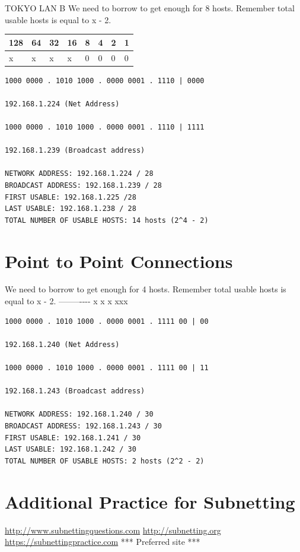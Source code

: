 TOKYO LAN B We need to borrow to get enough for 8 hosts. Remember total
usable hosts is equal to x - 2.

{\def\LTcaptype{none} %
\begin{longtable}[]{@{}llllllll@{}}
\toprule\noalign{}
128 & 64 & 32 & 16 & 8 & 4 & 2 & 1 \\
\midrule\noalign{}
\endhead
\bottomrule\noalign{}
\endlastfoot
x & x & x & x & 0 & 0 & 0 & 0 \\
\end{longtable}
}

\begin{lstlisting}
1000 0000 . 1010 1000 . 0000 0001 . 1110 | 0000

192.168.1.224 (Net Address)

1000 0000 . 1010 1000 . 0000 0001 . 1110 | 1111

192.168.1.239 (Broadcast address)

NETWORK ADDRESS: 192.168.1.224 / 28
BROADCAST ADDRESS: 192.168.1.239 / 28
FIRST USABLE: 192.168.1.225 /28
LAST USABLE: 192.168.1.238 / 28
TOTAL NUMBER OF USABLE HOSTS: 14 hosts (2^4 - 2)
\end{lstlisting}

\section{Point to Point Connections}\label{point-to-point-connections}

We need to borrow to get enough for 4 hosts. Remember total usable hosts
is equal to x - 2.
\textbar{}
\textbar---\textbar--\textbar--\textbar--\textbar-\textbar-\textbar-\textbar-\textbar{}
\textbar x \textbar x \textbar{} x\textbar{}
x\textbar x\textbar x\textbar{}

\begin{lstlisting}
1000 0000 . 1010 1000 . 0000 0001 . 1111 00 | 00

192.168.1.240 (Net Address)

1000 0000 . 1010 1000 . 0000 0001 . 1111 00 | 11

192.168.1.243 (Broadcast address)

NETWORK ADDRESS: 192.168.1.240 / 30
BROADCAST ADDRESS: 192.168.1.243 / 30
FIRST USABLE: 192.168.1.241 / 30
LAST USABLE: 192.168.1.242 / 30
TOTAL NUMBER OF USABLE HOSTS: 2 hosts (2^2 - 2)
\end{lstlisting}

\section{Additional Practice for
Subnetting}\label{additional-practice-for-subnetting}

\href{http://www.subnettingquestions.com/}{http://www.subnettingquestions.com}
\href{http://subnetting.org/}{http://subnetting.org}
\href{https://subnettingpractice.com/}{https://subnettingpractice.com}
*** Preferred site ***
